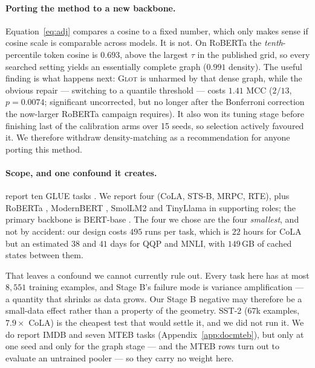 \documentclass{article}
\begin{document}
\paragraph{Porting the method to a new backbone.} Equation~\ref{eq:adj} compares
a cosine to a fixed number, which only makes sense if cosine scale is comparable
across models. It is not. On RoBERTa the \emph{tenth}-percentile token cosine is
$0.693$, above the largest $\tau$ in the published grid, so every searched
setting yields an essentially complete graph ($0.991$ density). The useful
finding is what happens next: \textsc{Glot} is unharmed by that dense graph,
while the obvious repair --- switching to a quantile threshold --- costs $1.41$
MCC ($2/13$, $p=0.0074$; significant uncorrected, but no longer after the
Bonferroni correction the now-larger RoBERTa campaign requires). It also won its
tuning stage before finishing last of the calibration arms over 15 seeds, so
selection actively favoured it. We therefore withdraw density-matching as a
recommendation for anyone porting this method.

\paragraph{Scope, and one confound it creates.} \citet{mantri2026glot} report ten
GLUE tasks \citep{wang2019glue}. We report four (CoLA, STS-B, MRPC, RTE), plus
RoBERTa \citep{liu2019roberta}, ModernBERT \citep{warner2024modernbert},
SmolLM2 \citep{benallal2025smollm2} and TinyLlama \citep{zhang2024tinyllama} in
supporting roles; the primary backbone is BERT-base \citep{devlin2019bert}. The four we chose are the four
\emph{smallest}, and not by accident: our design costs $495$ runs per task,
which is $22$ hours for CoLA but an estimated $38$ and $41$ days for QQP and
MNLI, with $149$\,GB of cached states between them.

That leaves a confound we cannot currently rule out. Every task here has at most
$8{,}551$ training examples, and Stage B's failure mode is variance
amplification --- a quantity that shrinks as data grows. Our Stage B negative
may therefore be a small-data effect rather than a property of the geometry.
SST-2 ($67$k examples, $7.9\times$ CoLA) is the cheapest test that would settle
it, and we did not run it. We do report IMDB and seven MTEB tasks
(Appendix~\ref{app:docmteb}), but only at one seed and only for the graph stage
--- and the MTEB rows turn out to evaluate an untrained pooler --- so they carry
no weight here.
\end{document}
